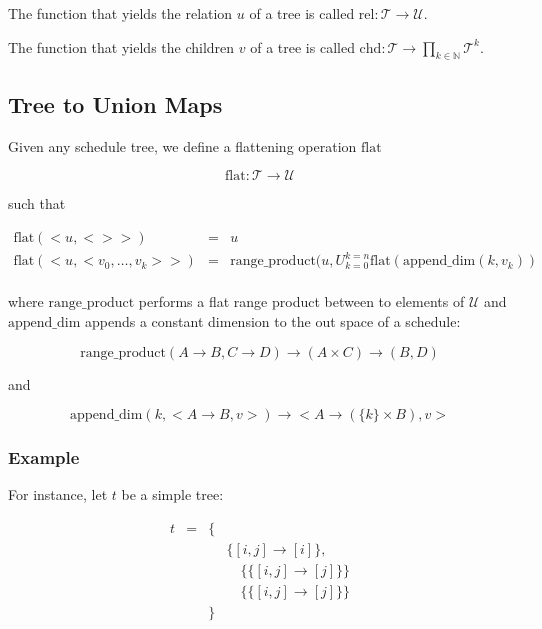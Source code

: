 \documentclass{article}
\begin{document}
The function that yields the relation $u$ of a tree is called $\text{rel}:\mathcal{T} \rightarrow \mathcal{U}$.

The function that yields the children $v$ of a tree is called $\text{chd}:\mathcal{T} \rightarrow \displaystyle\prod_{k\in\mathbb{N}}\mathcal{T}^k$.

\subsection{Tree to Union Maps}

Given any schedule tree, we define a flattening operation $\text{flat}$

\[
    \text{flat}: \mathcal{T} \rightarrow \mathcal{U}
\]

\noindent such that

\[
    \begin{array}{lcl}
        \text{flat}(<u, <> >) &=& u \\
        \text{flat}(<u, <v_0, \ldots, v_k> >) &=& \text{range\_product}(u, U_{k=0}^{k=n} \text{flat}(\text{append\_dim}(k, v_k)) \\
    \end{array}
\]

\noindent where $\text{range\_product}$ performs a flat range product between to elements of $\mathcal{U}$ and $\text{append\_dim}$ appends a constant dimension to the out space of a schedule:

\[
    \text{range\_product}(A \rightarrow B, C \rightarrow D) \rightarrow (A \times C) \rightarrow (B, D)
\]

\noindent and

\[
    \text{append\_dim}(k, <A \rightarrow B, v>) \rightarrow < A \rightarrow (\{k\} \times B), v >
\]

\subsubsection*{Example}

For instance, let $t$ be a simple tree:

\[
    \begin{array}{lcll}
        t &=& \{ &\\
          & &    & \{[i,j] \rightarrow [i] \},\\
          & &    & \quad\{ \{ [i,j] \rightarrow [j] \} \}\\
          & &    & \quad\{ \{ [i,j] \rightarrow [j] \} \}\\
          & & \} &\\
    \end{array}
\]
\end{document}
